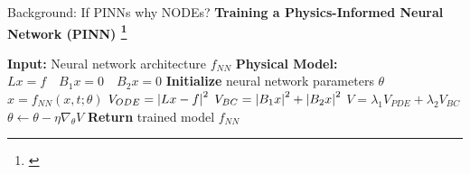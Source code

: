 \documentclass[dvipsnames, 9pt]{beamer}
\begin{document}
\begin{frame}{Background: If PINNs why NODEs? }
    \textbf{Training a Physics-Informed Neural Network (PINN) \footnote{\cite{raissi:perdikaris:karniadakis:2019}}}
    \begin{algorithmic}[1]
        \State \textbf{Input:} Neural network architecture $f_{NN}$
        \State \textbf{Physical Model:} $Lx=f \quad B_1 x = 0 \quad B_2 x = 0$
        \State \textbf{Initialize} neural network parameters $\theta$
        \Repeat
            \State $x = f_{NN}(x,t; \theta)$
            \State $V_{ODE} = \left| Lx - f \right|^{2}$ 
            \State $V_{BC} = \left| B_1 x \right|^{2} + \left| B_2 x \right|^{2}$
            \State $V = \lambda_1 V_{PDE}  + \lambda_2 V_{BC}$
            \State $\theta \leftarrow \theta - \eta \nabla_{\theta} V$
        \State \textbf{Return} trained model $f_{NN}$
    \end{algorithmic}
\end{frame}
\end{document}
